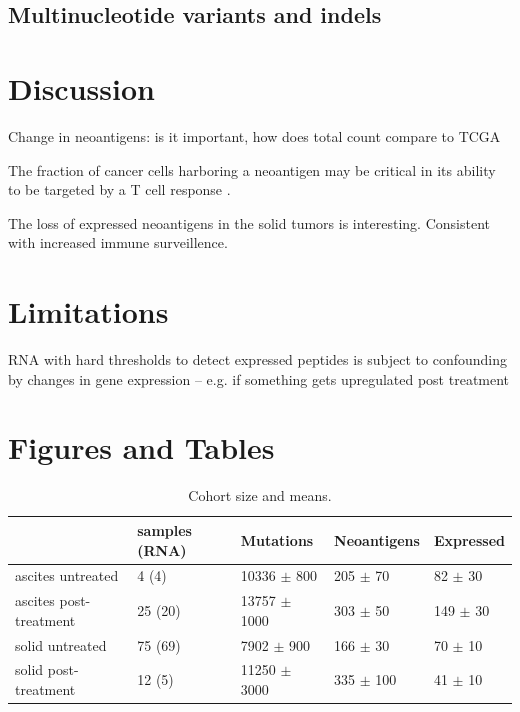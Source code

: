 \subsection*{Multinucleotide variants and indels}


\section*{Discussion}

Change in neoantigens: is it important, how does total count compare to TCGA

The fraction of cancer cells harboring a neoantigen may be critical in its ability to be targeted by a T cell response \cite{McGranahan_2016}.

The loss of expressed neoantigens in the solid tumors is interesting. Consistent with increased immune surveillence.



\section*{Limitations}
RNA with hard thresholds to detect expressed peptides is subject to confounding by changes in gene expression -- e.g. if something gets upregulated post treatment

\section*{Figures and Tables}

\begin{table}

\begin{tabular}{lllll}
\toprule
{} & samples (RNA) &         Mutations &    Neoantigens &     Expressed \\
\midrule
ascites untreated      &         4 (4) &   10336 $\pm$ 800 &   205 $\pm$ 70 &   82 $\pm$ 30 \\
ascites post-treatment &       25 (20) &  13757 $\pm$ 1000 &   303 $\pm$ 50 &  149 $\pm$ 30 \\
solid untreated        &       75 (69) &    7902 $\pm$ 900 &   166 $\pm$ 30 &   70 $\pm$ 10 \\
solid post-treatment   &        12 (5) &  11250 $\pm$ 3000 &  335 $\pm$ 100 &   41 $\pm$ 10 \\
\bottomrule
\end{tabular}


\caption{Cohort size and means.}
\label{tab:cohort}
\end{table}

